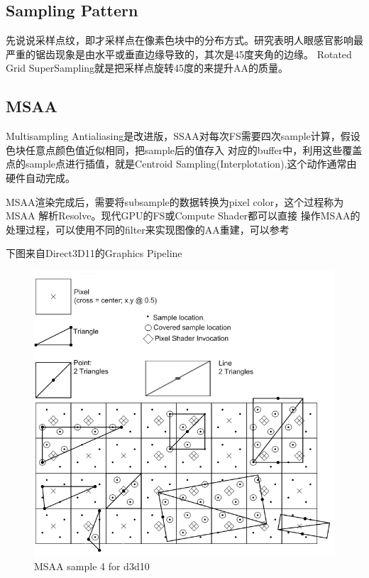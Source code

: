 \subsection{Sampling Pattern}

先说说采样点纹，即才采样点在像素色块中的分布方式。研究表明人眼感官影响最严重的锯齿现象是由水平或垂直边缘导致的，其次是45度夹角的边缘。
Rotated Grid SuperSampling就是把采样点旋转45度的来提升AA的质量。

\subsection{MSAA}

Multisampling Antialiasing是改进版，SSAA对每次FS需要四次sample计算，假设色块任意点颜色值近似相同，把sample后的值存入
对应的buffer中，利用这些覆盖点的sample点进行插值，就是Centroid Sampling(Interplotation),这个动作通常由硬件自动完成。

MSAA渲染完成后，需要将subsample的数据转换为pixel color，这个过程称为MSAA 解析Resolve。现代GPU的FS或Compute Shader都可以直接
操作MSAA的处理过程，可以使用不同的filter来实现图像的AA重建，可以参考\cite{OpenGLMultiSampling}

下图来自Direct3D11的Graphics Pipeline\cite{RasterizationRules} 

\begin{figure}[h]
    \centering
    \includegraphics[width=\textwidth]{images/d3d10-rasterrulesmsaa.png}
    \caption{MSAA sample 4 for d3d10}
\end{figure}

